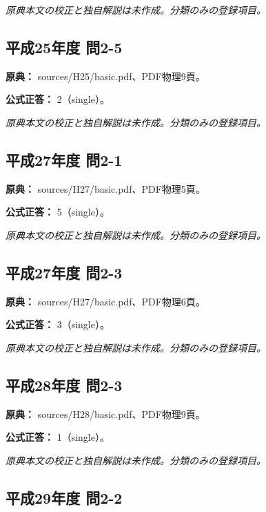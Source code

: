 \par\textit{原典本文の校正と独自解説は未作成。分類のみの登録項目。}

\subsection{平成25年度 問2-5}
\label{q:h25-reg-basic-2-5}

\noindent\textbf{原典：} sources/H25/basic.pdf、PDF物理9頁。

\textbf{公式正答：} 2（single）。

\par\textit{原典本文の校正と独自解説は未作成。分類のみの登録項目。}

\subsection{平成27年度 問2-1}
\label{q:h27-reg-basic-2-1}

\noindent\textbf{原典：} sources/H27/basic.pdf、PDF物理5頁。

\textbf{公式正答：} 5（single）。

\par\textit{原典本文の校正と独自解説は未作成。分類のみの登録項目。}

\subsection{平成27年度 問2-3}
\label{q:h27-reg-basic-2-3}

\noindent\textbf{原典：} sources/H27/basic.pdf、PDF物理6頁。

\textbf{公式正答：} 3（single）。

\par\textit{原典本文の校正と独自解説は未作成。分類のみの登録項目。}

\subsection{平成28年度 問2-3}
\label{q:h28-reg-basic-2-3}

\noindent\textbf{原典：} sources/H28/basic.pdf、PDF物理9頁。

\textbf{公式正答：} 1（single）。

\par\textit{原典本文の校正と独自解説は未作成。分類のみの登録項目。}

\subsection{平成29年度 問2-2}
\label{q:h29-reg-basic-2-2}

